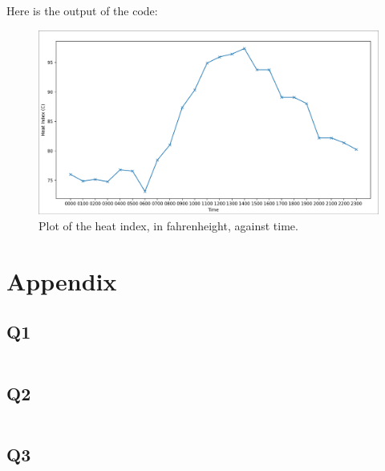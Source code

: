 \documentclass[11pt]{article}
\begin{document}
Here is the output of the code:

\begin{center}
\begin{figure}[H]
  \centering
  \includegraphics[scale=0.25]{Images/Q3.png}
  \caption{Plot of the heat index, in fahrenheight, against time.}
\end{figure}
\end{center}


\section{Appendix}

\subsection{Q1}

\inputminted[bgcolor=lightgray, breaklines, linenos]{python}{./Code/Q1.py}

\subsection{Q2}

\inputminted[bgcolor=lightgray, breaklines, linenos]{python}{./Code/Q2.py}

\subsection{Q3}

\inputminted[bgcolor=lightgray, breaklines, linenos]{python}{./Code/Q3.py}

\newpage
\printbibliography
\end{document}
